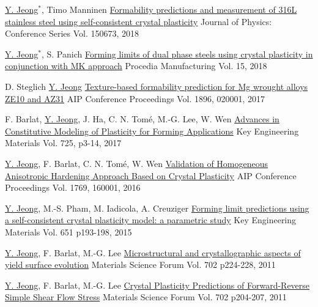 \begin{cventries}
\item
    \cventry
  {\underline{Y. Jeong}$^*$, Timo Manninen}
  {\href{http://iopscience.iop.org/article/10.1088/1742-6596/1063/1/012020}{Formability predictions and measurement of 316L stainless steel using self-consistent crystal plasticity}}
  {Journal of Physics: Conference Series}
  {Vol. 150673, 2018}
  {
  }

  \cventry
  {\underline{Y. Jeong}$^*$, S. Panich}
  {\href{https://doi.org/10.1016/j.promfg.2018.07.209}{Forming limits of dual phase steels using crystal plasticity in conjunction with MK approach}}
  {Procedia Manufacturing}
  {Vol. 15, 2018}
  {
  }

  \cventry
  {D. Steglich \underline{Y. Jeong}}
  {\href{https://doi.org/10.1063/1.5007958}{Texture-based formability prediction for Mg wrought alloys ZE10 and AZ31}}
  {AIP Conference Proceedings}
  {Vol. 1896, 020001, 2017}
  {
  }

  \cventry
  {F. Barlat, \underline{Y. Jeong}, J. Ha, C. N. Tom\'{e}, M.-G. Lee, W. Wen}
  {\href{https://dx.doi.org/10.4028/www.scientific.net/KEM.725.3}{Advances in Constitutive Modeling of Plasticity for Forming Applications}}
  {Key Engineering Materials}
  {Vol. 725, p3-14, 2017}
  {
  }

  \cventry
  {\underline{Y. Jeong}, F. Barlat, C. N. Tom\'{e}, W. Wen}
  {\href{http://dx.doi.org/10.1063/1.4963544}{Validation of Homogeneous Anisotropic Hardening Approach Based on Crystal Plasticity}}
  {AIP Conference Proceedings}
  {Vol. 1769, 160001, 2016}
  {
  }


  \cventry
  {\underline{Y. Jeong}, M.-S. Pham, M. Iadicola, A. Creuziger}
  {\href{https://doi.org/10.4028/www.scientific.net/KEM.651-653.193}{Forming limit predictions using a self-consistent crystal plasticity model: a parametric study}}
  {Key Engineering Materials}
  {Vol. 651 p193-198, 2015  }
  {
  }


  \cventry
  {\underline{Y. Jeong}, F. Barlat, M.-G. Lee}
  {\href{https://doi.org/10.4028/www.scientific.net/MSF.702-703.224}{Microstructural and crystallographic aspects of yield surface evolution}}
  {Materials Science Forum}
  {Vol. 702 p224-228, 2011}
  {
  }

  \cventry
  {\underline{Y. Jeong}, F. Barlat, M.-G. Lee}
  {\href{https://doi.org/10.4028/www.scientific.net/MSF.702-703.204}{Crystal Plasticity Predictions of Forward-Reverse Simple Shear Flow Stress}}
  {Materials Science Forum}
  {Vol. 702 p204-207, 2011}
  {
  }
\item

\end{cventries}
